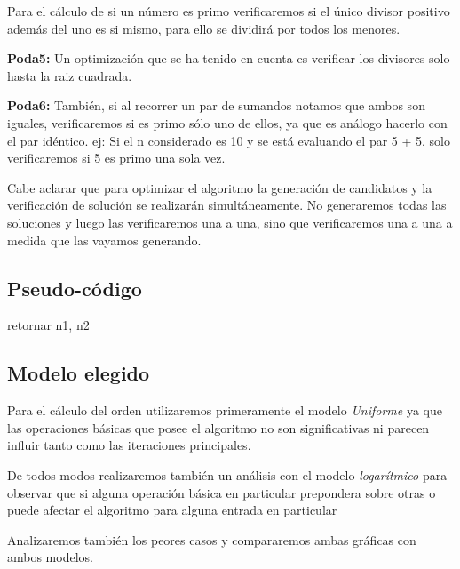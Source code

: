 \documentclass[11pt, a4paper, spanish]{article}
\begin{document}
	Para el c\'alculo de si un n\'umero es primo verificaremos si el \'unico divisor positivo adem\'as del uno es si mismo, para ello se dividir\'a por todos los menores.
	
		\textbf{Poda5:} Un optimizaci\'on que se ha tenido en cuenta es verificar los divisores solo hasta la raiz cuadrada.
		
		\textbf{Poda6:} Tambi\'en, si al recorrer un par de sumandos notamos que ambos son iguales, verificaremos si es primo s\'olo uno de ellos, ya que es an\'alogo hacerlo con el par id\'entico.
		ej: Si el n considerado es 10 y se est\'a evaluando el par 5 + 5, solo verificaremos si 5 es primo una sola vez.
	
	Cabe aclarar que para optimizar el algoritmo la generaci\'on de candidatos y la verificaci\'on de soluci\'on se realizar\'an simult\'aneamente. No generaremos todas las soluciones y luego las verificaremos una a una, sino que verificaremos una a una a medida que las vayamos generando.
	
	\subsection{Pseudo-c\'odigo}

\begin{algorithmic}

            \STATE retornar n1, n2
        \ENDIF
	\ENDFOR

\end{algorithmic}	

	\subsection{Modelo elegido}
	
		Para el c\'alculo del orden utilizaremos primeramente el modelo \emph{Uniforme} ya que las operaciones b\'asicas que posee el algoritmo no son significativas ni parecen influir tanto como las iteraciones principales.
		
		De todos modos realizaremos tambi\'en un an\'alisis con el modelo \emph{logar\'itmico} para observar que si alguna operaci\'on b\'asica en particular prepondera sobre otras o puede afectar el algoritmo para alguna entrada en particular
		
		Analizaremos tambi\'en los peores casos y compararemos ambas gr\'aficas con ambos modelos.
\end{document}
